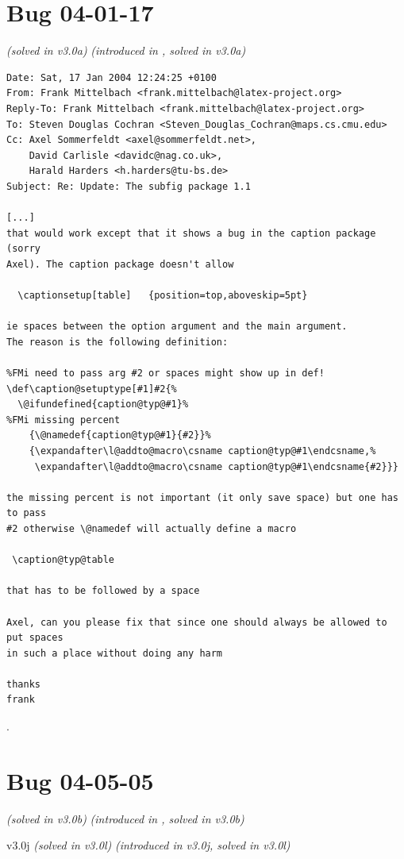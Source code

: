 \documentclass{article}
\newcommand*\bug[1]{%
  \clearpage\section*{Bug #1}\noindent
  \bugi}
\newcommand*\bugi[2][]{%
  \def\temp{#1}\ifx\temp\empty
    \textit{(solved in #2)}
  \else
    \textit{(introduced in #1, solved in #2)}
  \fi
  \par\noindent\ignorespaces}
\begin{document}

\bug{04-01-17}{v3.0a}

\begin{verbatim}
Date: Sat, 17 Jan 2004 12:24:25 +0100
From: Frank Mittelbach <frank.mittelbach@latex-project.org>
Reply-To: Frank Mittelbach <frank.mittelbach@latex-project.org>
To: Steven Douglas Cochran <Steven_Douglas_Cochran@maps.cs.cmu.edu>
Cc: Axel Sommerfeldt <axel@sommerfeldt.net>,
	David Carlisle <davidc@nag.co.uk>,
	Harald Harders <h.harders@tu-bs.de>
Subject: Re: Update: The subfig package 1.1

[...]
that would work except that it shows a bug in the caption package (sorry
Axel). The caption package doesn't allow

  \captionsetup[table]   {position=top,aboveskip=5pt}

ie spaces between the option argument and the main argument.
The reason is the following definition:

%FMi need to pass arg #2 or spaces might show up in def!
\def\caption@setuptype[#1]#2{%
  \@ifundefined{caption@typ@#1}%
%FMi missing percent
    {\@namedef{caption@typ@#1}{#2}}%
    {\expandafter\l@addto@macro\csname caption@typ@#1\endcsname,%
     \expandafter\l@addto@macro\csname caption@typ@#1\endcsname{#2}}}

the missing percent is not important (it only save space) but one has to pass
#2 otherwise \@namedef will actually define a macro

 \caption@typ@table 

that has to be followed by a space

Axel, can you please fix that since one should always be allowed to put spaces
in such a place without doing any harm

thanks
frank
\end{verbatim}

\begingroup
\captionsetup[table]   {position=top,aboveskip=5pt}
  {.\newline}
\endgroup


\bug{04-05-05}{v3.0b}
\bugi[v3.0j]{v3.0l}
\end{document}
